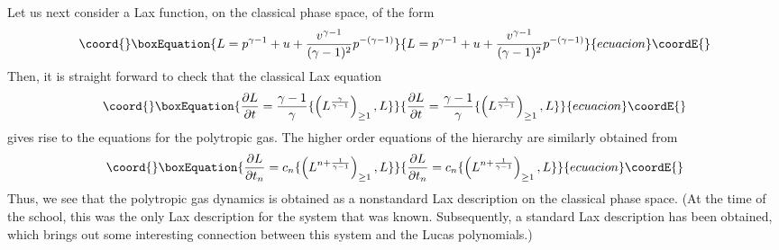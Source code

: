 \documentclass[a4paper,11pt]{article}
\begin{document}
Let us next consider a Lax function, on the classical phase space, of
the form 
\begin{equation}\coord{}\boxEquation{
L = p^{\gamma -1} + u + {v^{\gamma -1}\over (\gamma -1)^{2}}
p^{-(\gamma -1)}
}{
L = p^{\gamma -1} + u + {v^{\gamma -1}\over (\gamma -1)^{2}}
p^{-(\gamma -1)}
}{ecuacion}\coordE{}\end{equation}
Then, it is straight forward to check that the classical Lax equation
\begin{equation}\coord{}\boxEquation{
{\partial L\over \partial t} = {\gamma -1\over \gamma}
\{\left(L^{\gamma\over \gamma -1}\right)_{\geq 1}, L\}
}{
{\partial L\over \partial t} = {\gamma -1\over \gamma}
\{\left(L^{\gamma\over \gamma -1}\right)_{\geq 1}, L\}
}{ecuacion}\coordE{}\end{equation}
gives rise to the equations for the polytropic gas. The higher order
equations of the hierarchy are similarly obtained from
\begin{equation}\coord{}\boxEquation{
{\partial L\over \partial t_{n}} = c_{n} \{\left(L^{n+{1\over \gamma
-1}}\right)_{\geq 1}, L\}
}{
{\partial L\over \partial t_{n}} = c_{n} \{\left(L^{n+{1\over \gamma
-1}}\right)_{\geq 1}, L\}
}{ecuacion}\coordE{}\end{equation}
Thus, we see that the polytropic gas dynamics is obtained as a
nonstandard Lax description on the classical phase space. (At the time
of the school, this was the only Lax description for the system that
was known. Subsequently, a standard Lax description has been obtained,
which brings out some interesting connection between this system and
the Lucas polynomials.)
\end{document}
